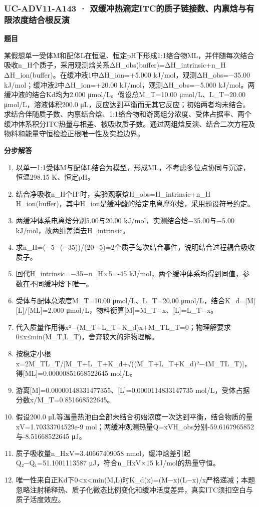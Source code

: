 \documentclass[UTF8,11pt,a4paper]{ctexart}
\begin{document}
\subsubsection*{UC-ADV11-A143 · 双缓冲热滴定ITC的质子链接数、内禀焓与有限浓度结合根反演}
\noindent\textbf{题目}\par
某假想单一受体M和配体L在恒温、恒定pH下形成1:1络合物ML，并伴随每次结合吸收n\_H个质子，采用观测焓关系ΔH\_obs(buffer)=ΔH\_intrinsic+n\_H ΔH\_ion(buffer)。在缓冲液1中ΔH\_ion=+5.000 kJ/mol，观测ΔH\_obs=−35.00 kJ/mol；缓冲液2中ΔH\_ion=+20.00 kJ/mol，观测ΔH\_obs=−5.000 kJ/mol。两缓冲液的结合Kd均为2.000 μmol/L。假设总M\_T=10.00 μmol/L、L\_T=20.00 μmol/L，溶液体积200.0 μL，反应达到平衡而无其它反应；初始两者均未结合。求结合伴随质子数、内禀结合焓、1:1络合物和游离组分浓度、受体占据率、两个缓冲体系积分ITC热量与相差、被吸收质子数。通过两组焓反演、结合二次方程及物料和能量守恒检验正根唯一性及实验边界。\par
\medskip\noindent\textbf{分步解答}
\begin{enumerate}
\item 以单一1:1受体M与配体L结合为模型，形成ML，不考虑多位点协同与沉淀，恒温298.15 K、恒定pH。
\item 结合净吸收n\_H个H⁺时，实验观察焓H\_obs=H\_intrinsic+n\_H H\_ion(buffer)，其中H\_ion是缓冲酸的给定电离摩尔焓，采用题设符号约定。
\item 两缓冲体系电离焓分别5.00与20.00 kJ/mol，实测结合焓−35.00与−5.00 kJ/mol，故两组差消去H\_intrinsic。
\item 求n\_H=(−5−(−35))/(20−5)=2个质子每次结合事件，说明结合过程耦合吸收质子。
\item 回代H\_intrinsic=−35−n\_H×5=-45 kJ/mol，两个缓冲体系均得到同值，参数在不同缓冲焓下唯一。
\item 受体与配体总浓度M\_T=10.00 μmol/L、L\_T=20.00 μmol/L，结合K\_d=[M][L]/[ML]=2.000 μmol/L，物料衡算[M]=M\_T−x、[L]=L\_T−x。
\item 代入质量作用得x²−(M\_T+L\_T+K\_d)x+M\_TL\_T=0；物理解要求0≤x≤min(M\_T,L\_T)，舍弃较大的非物理解。
\item 按稳定小根x=2M\_TL\_T/[M\_T+L\_T+K\_d+√((M\_T+L\_T+K\_d)²−4M\_TL\_T)]，得[ML]=0.00000851668522645 mol/L。
\item 游离[M]=0.00000148331477355、[L]=0.0000114833147735 mol/L，受体占据分数x/M\_T=0.851668522645。
\item 假设200.0 μL等温量热池由全部未结合初始浓度一次达到平衡，结合物质的量xV=1.70333704529e-9 mol；两缓冲观测热量Q=xVH\_obs分别-59.6167965852与-8.51668522645 μJ。
\item 质子吸收量n\_HxV=3.40667409058 nmol，缓冲焓差引起Q₂−Q₁=51.1001113587 μJ，符合n\_HxV×15 kJ/mol的热量守恒。
\item 唯一性来自正Kd下0<x<min(M,L)时K\_d(x)=(M−x)(L−x)/x严格递减；本题忽略注射稀释热、质子化微态比例变化和缓冲活度差异，真实ITC须扣空白与质子活度效应。
\end{enumerate}
\end{document}
